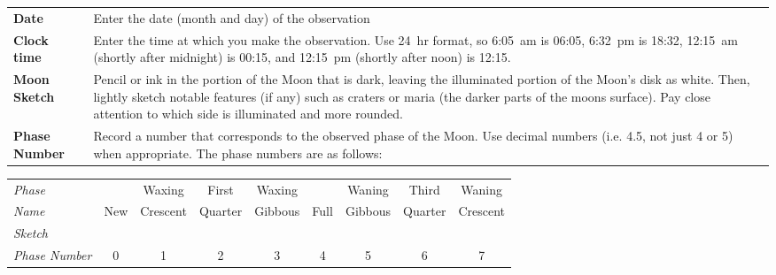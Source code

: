 \documentclass{article}
\newcommand{\tkzpiccntr}[4]{\filldraw [fill=white](#1)++(-0.5*#2,-0.5*#3) rectangle +(#2,#3) [path picture=
	{
		\node at (path picture bounding box.center) 
		{
			\texttt{[image: \#4]}
		};
	}
];
}
\newcommand{\tikzmoon}{\tkzpiccntr{0.5,0.5}{1}{1}{full_moon_white_bg.png};\draw[black, line width=0.25mm] (0.5,0.5) circle (0.5);}
\newcommand{\BP}{\begin{tikzpicture}}
\newcommand{\EP}{\end{tikzpicture}}
\newcommand{\tikzmoonNew}{\BP\draw[black, line width=0.25mm] (0,0) -- (1,0) -- (1,1) -- (0,1) -- cycle;\fill[black] (0.5,0.5) circle(0.5);\EP}
\newcommand{\tikzmoonWxC}{\BP\tikzmoon\fill[black] (0.5,0.0) arc(270:90:0.5) arc (90:-90:0.25 and 0.5) -- cycle;\EP}
\newcommand{\tikzmoonFQ}{\BP\tikzmoon\fill[black] (0.5,0.0) arc(270:90:0.5) -- cycle;\EP}
\newcommand{\tikzmoonWxG}{\BP\tikzmoon\fill[black] (0.5,0.0) arc(270:90:0.5) arc (90:270:0.25 and 0.5) -- cycle;\EP}
\newcommand{\tikzmoonFull}{\BP\tikzmoon;\EP}
\newcommand{\tikzmoonWnG}{\BP\tikzmoon\fill[black] (0.5,0.0) arc(-90:90:0.5) arc (90:-90:0.25 and 0.5) -- cycle;\EP}
\newcommand{\tikzmoonTQ}{\BP\tikzmoon\fill[black] (0.5,0.0) arc(-90:90:0.5) -- cycle;\EP}
\newcommand{\tikzmoonWnC}{\BP\tikzmoon\fill[black] (0.5,0.0) arc(-90:90:0.5) arc (90:270:0.25 and 0.5) -- cycle;\EP}
\begin{document}
\noindent
\begin{tabular}{p{1.25in}p{5in}}
\textbf{Date} & Enter the date (month and day) of the observation\\
\textbf{Clock time} & Enter the time at which you make the observation. Use 24~hr format, so 6:05~am is 06:05, 6:32~pm is 18:32, 12:15~am (shortly after midnight) is 00:15, and 12:15~pm (shortly after noon) is 12:15.\\
\textbf{Moon Sketch} & Pencil or ink in the portion of the Moon that is dark, leaving the illuminated portion of the Moon's disk as white. Then, lightly sketch notable features (if any) such as craters or maria (the darker parts of the moons surface). Pay close attention to which side is illuminated and more rounded.\\
\textbf{Phase Number} & Record a number that corresponds to the observed phase of the Moon. Use decimal numbers (i.e. 4.5, not just 4 or 5) when appropriate. The phase numbers are as follows:\\
\end{tabular}
\begin{tabular}{|l|cccccccc|}
\hline
\textit{Phase}	 &  & Waxing & First & Waxing &  & Waning & Third & Waning\\
\textit{Name} & New & Crescent & Quarter & Gibbous & Full & Gibbous & Quarter & Crescent\\
\textit{Sketch} & \tikzmoonNew& \tikzmoonWxC & \tikzmoonFQ & \tikzmoonWxG & \tikzmoonFull & \tikzmoonWnG & \tikzmoonTQ & \tikzmoonWnC\\
\textit{Phase Number} & 0 & 1 & 2 & 3 & 4 & 5 & 6 & 7\\
\hline
\end{tabular}\\
\end{document}
